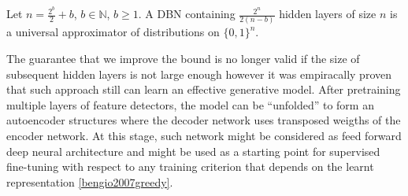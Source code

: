 \documentclass[../report/report.tex]{subfiles}
\begin{document}
\cite{montufar2010refinements}
\begin{theorem} [Guido-Ay, 2010] Let $n = \frac{2^b}{2} + b$, $b \in \mathbb{N}$, $b \geqslant 1$. A DBN containing $\frac{2^n}{2(n-b)}$ hidden layers of size $n$ is a universal approximator of distributions on $\{0,1 \}^n$.
\end{theorem}

 The guarantee that we improve the bound is no longer valid if the size of subsequent hidden layers is not large enough
 however it was empiracally proven that such approach still can learn an effective generative model. After pretraining multiple layers of feature detectors, the model can be ``unfolded'' to form an autoencoder structures 
where the decoder network uses transposed weigths of the encoder network. At this stage, such network might be considered
as feed forward deep neural architecture and might be used as a starting point for supervised fine-tuning with respect to any
training criterion that depends on the learnt representation \ref{bengio2007greedy}.
 
\end{document}
